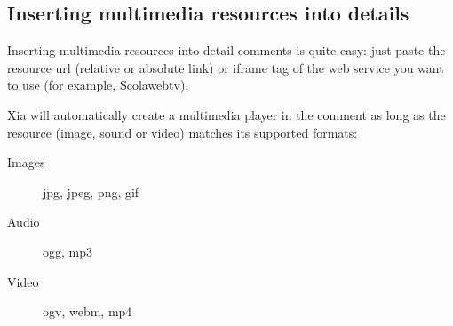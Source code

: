 

\subsection{Inserting multimedia resources into details}\label{enrichissement_multimedia}

Inserting multimedia resources into detail comments is quite easy: just paste 
the resource url (relative or absolute link) or iframe tag of the web service 
you want to use (for example, \href{https://scolawebtv.crdp-versailles.fr/}
{Scolawebtv}).

Xia will automatically create a multimedia player in the comment as long as 
the resource (image, sound or video) matches its supported formats: 
\begin{description}
 \item [Images] jpg, jpeg, png, gif
 \item [Audio] ogg, mp3
 \item [Video] ogv, webm, mp4
\end{description}


